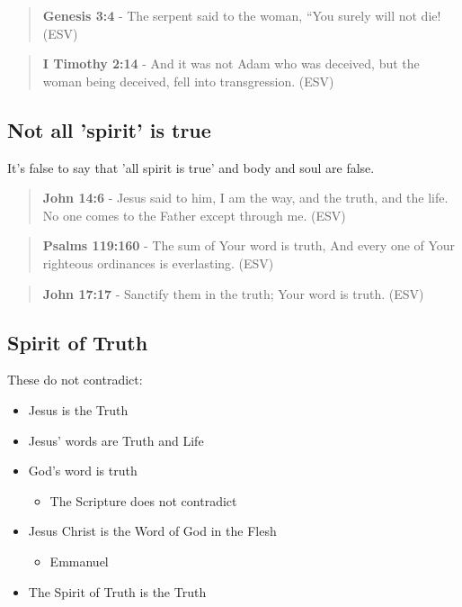 \documentclass[11pt]{article}
\begin{document}
\begin{quote}
\textbf{Genesis 3:4} - The serpent said to the woman, “You surely will not die! (ESV)
\end{quote}

\begin{quote}
\textbf{I Timothy 2:14} - And it was not Adam who was deceived, but the woman being deceived, fell into transgression. (ESV)
\end{quote}

\subsection{Not all 'spirit' is true}
\label{sec:org62fef44}
It's false to say that 'all spirit is true' and body and soul are false.

\begin{quote}
\textbf{John 14:6} - Jesus said to him, I am the way, and the truth, and the life. No one comes to the Father except through me. (ESV)
\end{quote}

\begin{quote}
\textbf{Psalms 119:160} - The sum of Your word is truth, And every one of Your righteous ordinances is everlasting. (ESV)
\end{quote}

\begin{quote}
\textbf{John 17:17} - Sanctify them in the truth; Your word is truth. (ESV)
\end{quote}

\subsection{Spirit of Truth}
\label{sec:org10c6501}
These do not contradict:
\begin{itemize}
\item Jesus is the Truth
\item Jesus' words are Truth and Life
\item God's word is truth
\begin{itemize}
\item The Scripture does not contradict
\end{itemize}
\item Jesus Christ is the Word of God in the Flesh
\begin{itemize}
\item Emmanuel
\end{itemize}
\item The Spirit of Truth is the Truth
\end{itemize}
\end{document}
